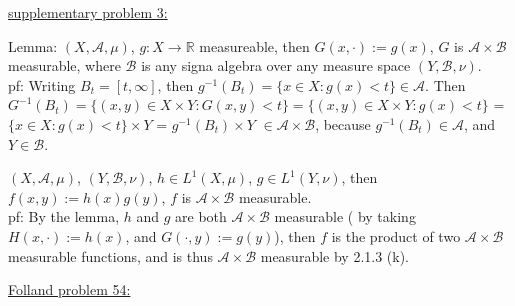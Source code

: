 \documentclass[12pt]{article}
\newcommand{\reals}[0] { \mathbb{R}}
\newcommand{\A}[0] { \mathcal{A} }
\newcommand{\B}[0] { \mathcal{B} }
\begin{document}
\begin{flushleft}
\underline{supplementary problem 3:}
\end{flushleft}

\begin{flushleft}
Lemma: $ (X, \A, \mu )$, $g: X \rightarrow \reals$ measureable, then $G(x, \cdot ) := g(x)$, $G$ is $\A \times \B$ measurable, where $\B$ is any signa algebra over any measure space $ (Y, \B, \nu )$. \\
pf: Writing $B_t = [ t,  \infty ]$, then $g^{-1} (B_t) = \{ x \in X: g(x) < t \} \in \A$. Then $G^{-1} (B_t) = \{ (x,y) \in X \times Y: G(x,y) < t  \} = \{ (x,y) \in X \times Y: g(x) < t  \} $ = 
$  \{ x \in X: g(x) < t  \} \times Y $ = $g^{-1} (B_t) \times Y$ $ \in \A \times \B$, because $g^{-1} (B_t) \in \A$, and $Y \in \B$.
\end{flushleft}


\begin{flushleft}
$ (X, \A, \mu )$, $ (Y, \B, \nu )$, $h \in L^1( X, \mu )$, $g \in L^1( Y, \nu )$, then $f(x,y) := h(x) g(y)$, $f$ is $\A \times \B$ measurable. \\
pf: By the lemma, $h$ and $g$ are both $\A \times \B$ measurable ( by taking $H(x, \cdot) := h(x) $, and $G(\cdot, y) := g(y) $), then $f$ is the product of two $\A \times \B$ measurable functions, and is thus $\A \times \B$ measurable by 2.1.3 (k).
\end{flushleft}




\begin{flushleft}
\underline{Folland problem 54:}
\end{flushleft}
\end{document}
